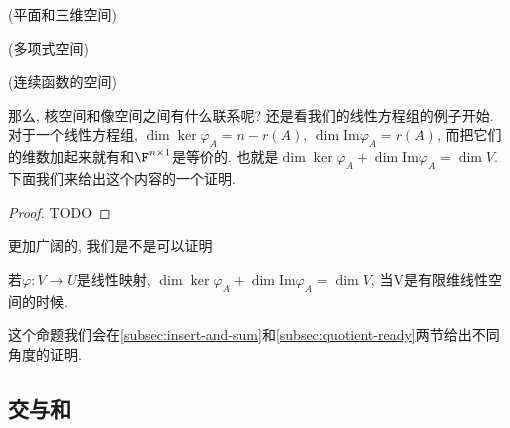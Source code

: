 \begin{example}
(平面和三维空间)
\end{example}
%
\begin{example}
(多项式空间)
\end{example}
%
\begin{example}
(连续函数的空间)
\end{example}
%
那么, 核空间和像空间之间有什么联系呢? 还是看我们的线性方程组的例子开始. 对于一个线性方程组, $\dim\ker\varphi_{A}=n-r(A)$,
$\dim\text{Im}\varphi_{A}=r(A)$, 而把它们的维数加起来就有和$\F^{n\times1}$是等价的.
也就是$\dim\ker\varphi_{A}+\dim\text{Im}\varphi_{A}=\dim V$. 下面我们来给出这个内容的一个证明.
\begin{proof}
TODO
\end{proof}
更加广阔的, 我们是不是可以证明
\begin{prop}
\label{dim-sum-eq-all}若$\varphi:V\to U$是线性映射, $\dim\ker\varphi_{A}+\dim\text{Im}\varphi_{A}=\dim V$,
当V是有限维线性空间的时候. 
\end{prop}
这个命题我们会在\ref{subsec:insert-and-sum}和\ref{subsec:quotient-ready}两节给出不同角度的证明. 

\subsection{交与和\label{subsec:insert-and-sum}}


